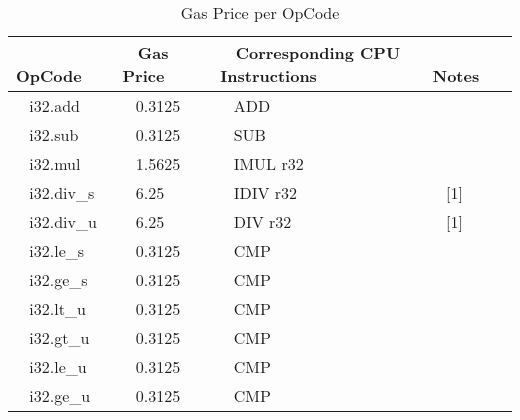 \documentclass{article}
\begin{document}
\begin{table}
\centering
\captionsetup{labelformat=empty}
\caption{Gas Price per OpCode}
\begin{tabular}{|l|l|l|l|}
\hline
\textbf{~ OpCode~~}                         & \textbf{~ Gas Price~~}       & \textbf{~ Corresponding CPU Instructions~ ~}         & ~ \textbf{Notes~~}    \\
\hline
~ i32.add                                   & ~ 0.3125                     & ~ ADD                                                &                       \\
\hline
~ i32.sub                                   & ~ 0.3125                     & ~ SUB                                                &                       \\
\hline
~ i32.mul                                   & ~ 1.5625                     & ~ IMUL r32                                           &                       \\
\hline
~ i32.div\_s                                & ~ 6.25                       & ~ IDIV r32                                           & ~ [1]~~               \\
\hline
~ i32.div\_u                                & ~ 6.25                       & ~ DIV r32                                            & ~ [1]~~               \\
\hline
~ i32.le\_s                                 & ~ 0.3125                     & ~ CMP                                                &                       \\
\hline
~ i32.ge\_s                                 & ~ 0.3125                     & ~ CMP                                                &                       \\
\hline
~ i32.lt\_u                                 & ~ 0.3125                     & ~ CMP                                                &                       \\
\hline
~ i32.gt\_u                                 & ~ 0.3125                     & ~ CMP                                                &                       \\
\hline
~ i32.le\_u                                 & ~ 0.3125                     & ~ CMP                                                &                       \\
\hline
~ i32.ge\_u                                 & ~ 0.3125                     & ~ CMP                                                &                       \\

\end{tabular}
\end{table}
\end{document}
